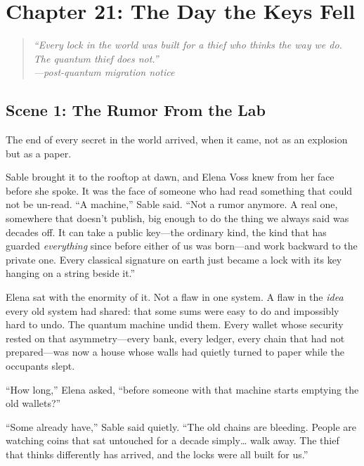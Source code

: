 \hypertarget{chapter-21-the-day-the-keys-fell}{%
\section{Chapter 21: The Day the Keys
Fell}\label{chapter-21-the-day-the-keys-fell}}

\begin{quote}
\itshape ``Every lock in the world was built for a thief who thinks the way we
do. The quantum thief does not.''\\
\normalfont\hfill---post-quantum migration notice
\end{quote}

\hypertarget{scene-1-the-rumor-from-the-lab}{%
\subsection{Scene 1: The Rumor From the
Lab}\label{scene-1-the-rumor-from-the-lab}}

The end of every secret in the world arrived, when it came, not as an explosion
but as a paper.

Sable brought it to the rooftop at dawn, and Elena Voss knew from her face before
she spoke. It was the face of someone who had read something that could not be
un-read. ``A machine,'' Sable said. ``Not a rumor anymore. A real one, somewhere
that doesn't publish, big enough to do the thing we always said was decades off.
It can take a public key---the ordinary kind, the kind that has guarded
\emph{everything} since before either of us was born---and work backward to the
private one. Every classical signature on earth just became a lock with its key
hanging on a string beside it.''

Elena sat with the enormity of it. Not a flaw in one system. A flaw in the
\emph{idea} every old system had shared: that some sums were easy to do and
impossibly hard to undo. The quantum machine undid them. Every wallet whose
security rested on that asymmetry---every bank, every ledger, every chain that had
not prepared---was now a house whose walls had quietly turned to paper while the
occupants slept.

``How long,'' Elena asked, ``before someone with that machine starts emptying the
old wallets?''

``Some already have,'' Sable said quietly. ``The old chains are bleeding. People
are watching coins that sat untouched for a decade simply\ldots{} walk away. The
thief that thinks differently has arrived, and the locks were all built for us.''

